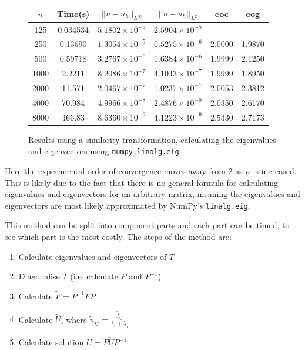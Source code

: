 \documentclass{article}
\numberwithin{equation}{section}
\begin{document}
\begin{figure}[H]
\centering
\begin{tabular}{|c|c|c|c|c|c|}
\hline
$n$ & Time(s) & $|| u - u_h ||_{L^{\infty}}$ &$|| u - u_h ||_{L^{2}}$ & eoc & eog \\
\hline
125 & 0.034534 & $5.1802 \times 10^{-5}$ & $2.5904 \times 10^{-5}$ & -  & - \\
250 & 0.13690 & $1.3054 \times 10^{-5}$ & $6.5275 \times 10^{-6}$ & 2.0000 & 1.9870  \\
500 & 0.59718 & $3.2767 \times 10^{-6}$ & $1.6384 \times 10^{-6}$ & 1.9999 & 2.1250  \\
1000 & 2.2211 & $8.2086 \times 10^{-7}$ & $4.1043 \times 10^{-7}$ & 1.9999 & 1.8950  \\
2000 & 11.571 & $2.0467 \times 10^{-7}$ & $1.0237 \times 10^{-7}$ & 2.0053 & 2.3812  \\
4000 & 70.984 & $4.9966 \times 10^{-8}$ & $2.4876 \times 10^{-8}$ & 2.0350 & 2.6170  \\
8000 & 466.83 & $8.6360 \times 10^{-9}$ & $4.1223 \times 10^{-9}$ & 2.5330 & 2.7173  \\
\hline
\end{tabular}
\captionsetup{justification=centering}
\caption{Results using a similarity transformation, calculating the eigenvalues and eigenvectors using \texttt{numpy.linalg.eig}.}
\end{figure}

Here the experimental order of convergence moves away from 2 as $n$ is increased. This is likely due to the fact that there is no general formula for calculating eigenvalues and eigenvectors for an arbitrary matrix, meaning the eigenvalues and eigenvectors are most likely approximated by NumPy's \texttt{linalg.eig}.

This method can be split into component parts and each part can be timed, to see which part is the most costly. The steps of the method are:
\begin{enumerate}
\item Calculate eigenvalues and eigenvectors of $T$
\item Diagonalise $T$ (i.e. calculate $P$ and $P^{-1}$)
\item Calculate $\tilde{F}=P^{-1}FP$
\item Calculate $\tilde{U}$, where $\tilde{u}_{ij} = \frac{\tilde{f}_{ij}}{\lambda_i + \lambda_j}$
\item Calculate solution $U=P \tilde{U}P^{-1}$
\end{enumerate}
\end{document}
